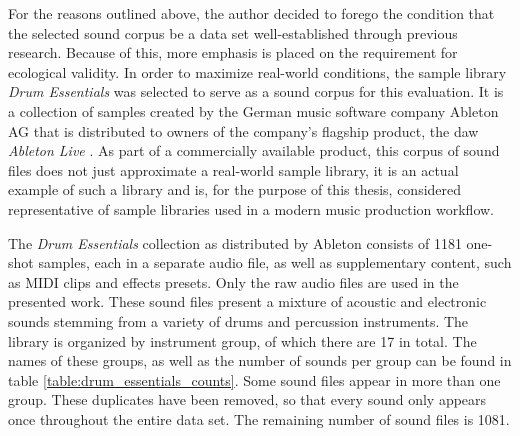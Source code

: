 For the reasons outlined above, the author decided to forego the condition that
the selected sound corpus be a data set well-established through previous
research. Because of this, more emphasis is placed on the requirement for
ecological validity. In order to maximize real-world conditions, the sample
library \textit{Drum Essentials} \citep{drumessentials2019} was selected to
serve as a sound corpus for this evaluation. It is a collection of samples
created by the German music software company Ableton AG that is distributed to
owners of the company's flagship product, the \gls{daw} \textit{Ableton Live}
\citep{abletonlive2019}. As part of a commercially available product, this
corpus of sound files does not just approximate a real-world sample library, it
is an actual example of such a library and is, for the purpose of this thesis,
considered representative of sample libraries used in a modern music production
workflow.

\smallskip

The \textit{Drum Essentials} collection as distributed by Ableton consists of
1181 one-shot samples, each in a separate audio file, as well as supplementary
content, such as MIDI clips and effects presets. Only the raw audio files are
used in the presented work. These sound files present a mixture of acoustic
and electronic sounds stemming from a variety of drums and percussion
instruments. The library is organized by instrument group, of which there are
17 in total. The names of these groups, as well as the number of sounds per
group can be found in table \ref{table:drum_essentials_counts}. Some sound files
appear in more than one group. These duplicates have been removed, so that every
sound only appears once throughout the entire data set. The remaining number of
sound files is 1081.

\renewcommand{\arraystretch}{1.2}

